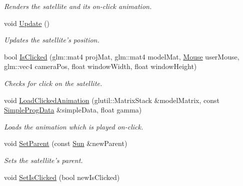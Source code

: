 \begin{DoxyCompactItemize}
\begin{DoxyCompactList}\small\item\em Renders the satellite and its on-\/click animation. \end{DoxyCompactList}\item 
void \hyperlink{class_satellite_a9922529e27792578c7047bb91d27e21f}{Update} ()
\begin{DoxyCompactList}\small\item\em Updates the satellite's position. \end{DoxyCompactList}\item 
bool \hyperlink{class_satellite_a9701b3bb18389b93b70a75f17008d629}{Is\-Clicked} (glm\-::mat4 proj\-Mat, glm\-::mat4 model\-Mat, \hyperlink{class_mouse}{Mouse} user\-Mouse, glm\-::vec4 camera\-Pos, float window\-Width, float window\-Height)
\begin{DoxyCompactList}\small\item\em Checks for click on the satellite. \end{DoxyCompactList}\item 
\hypertarget{class_satellite_a8234af99478c820231f5d52289b7bca2}{void \hyperlink{class_satellite_a8234af99478c820231f5d52289b7bca2}{Load\-Clicked\-Animation} (glutil\-::\-Matrix\-Stack \&model\-Matrix, const \hyperlink{struct_simple_prog_data}{Simple\-Prog\-Data} \&simple\-Data, float gamma)}\label{class_satellite_a8234af99478c820231f5d52289b7bca2}

\begin{DoxyCompactList}\small\item\em Loads the animation which is played on-\/click. \end{DoxyCompactList}\item 
\hypertarget{class_satellite_a84782cdb794e9c2d86966bfb0487d428}{void \hyperlink{class_satellite_a84782cdb794e9c2d86966bfb0487d428}{Set\-Parent} (const \hyperlink{class_sun}{Sun} \&new\-Parent)}\label{class_satellite_a84782cdb794e9c2d86966bfb0487d428}

\begin{DoxyCompactList}\small\item\em Sets the satellite's parent. \end{DoxyCompactList}\item 
\hypertarget{class_satellite_ae55915277ebb216b20c86895c9c4343e}{void \hyperlink{class_satellite_ae55915277ebb216b20c86895c9c4343e}{Set\-Is\-Clicked} (bool new\-Is\-Clicked)}\label{class_satellite_ae55915277ebb216b20c86895c9c4343e}


\end{DoxyCompactItemize}
